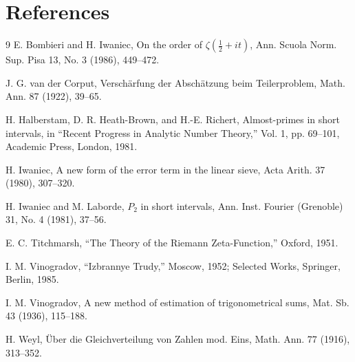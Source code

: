 \documentclass[10pt]{article}
\begin{document}
\section*{References}
\begin{thebibliography}{9}
E. Bombieri and H. Iwaniec, On the order of
$\zeta\left(\frac12+it\right)$, Ann. Scuola Norm. Sup. Pisa 13, No. 3
(1986), 449--472.

J. G. van der Corput, Verschärfung der Abschätzung beim Teilerproblem,
Math. Ann. 87 (1922), 39--65.

H. Halberstam, D. R. Heath-Brown, and H.-E. Richert, Almost-primes in
short intervals, in ``Recent Progress in Analytic Number Theory,'' Vol. 1,
pp. 69--101, Academic Press, London, 1981.

H. Iwaniec, A new form of the error term in the linear sieve,
Acta Arith. 37 (1980), 307--320.

H. Iwaniec and M. Laborde, $P_2$ in short intervals,
Ann. Inst. Fourier (Grenoble) 31, No. 4 (1981), 37--56.

E. C. Titchmarsh, ``The Theory of the Riemann Zeta-Function,'' Oxford,
1951.

I. M. Vinogradov, ``Izbrannye Trudy,'' Moscow, 1952; Selected Works,
Springer, Berlin, 1985.

I. M. Vinogradov, A new method of estimation of trigonometrical sums,
Mat. Sb. 43 (1936), 115--188.

H. Weyl, Über die Gleichverteilung von Zahlen mod. Eins,
Math. Ann. 77 (1916), 313--352.
\end{thebibliography}
\end{document}
